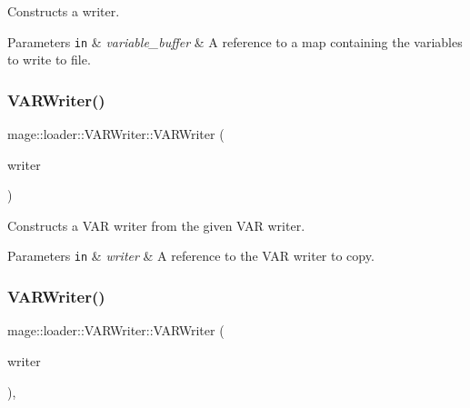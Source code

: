 Constructs a writer.


\begin{DoxyParams}[1]{Parameters}
\mbox{\tt in}  & {\em variable\+\_\+buffer} & A reference to a map containing the variables to write to file. \\
\hline
\end{DoxyParams}
\hypertarget{classmage_1_1loader_1_1_v_a_r_writer_a5ddb3fcd75952ecc8593bc284dc3db0e}{}\label{classmage_1_1loader_1_1_v_a_r_writer_a5ddb3fcd75952ecc8593bc284dc3db0e} 
\subsubsection{\texorpdfstring{V\+A\+R\+Writer()}{VARWriter()}\hspace{0.1cm}{\footnotesize\ttfamily [2/3]}}
{\footnotesize\ttfamily mage\+::loader\+::\+V\+A\+R\+Writer\+::\+V\+A\+R\+Writer (\begin{DoxyParamCaption}\item[{const \hyperlink{classmage_1_1loader_1_1_v_a_r_writer}{V\+A\+R\+Writer} \&}]{writer }\end{DoxyParamCaption})\hspace{0.3cm}{\ttfamily [delete]}}

Constructs a V\+AR writer from the given V\+AR writer.


\begin{DoxyParams}[1]{Parameters}
\mbox{\tt in}  & {\em writer} & A reference to the V\+AR writer to copy. \\
\hline
\end{DoxyParams}
\hypertarget{classmage_1_1loader_1_1_v_a_r_writer_ab8a676252c909a6f8914d786048de255}{}\label{classmage_1_1loader_1_1_v_a_r_writer_ab8a676252c909a6f8914d786048de255} 
\subsubsection{\texorpdfstring{V\+A\+R\+Writer()}{VARWriter()}\hspace{0.1cm}{\footnotesize\ttfamily [3/3]}}
{\footnotesize\ttfamily mage\+::loader\+::\+V\+A\+R\+Writer\+::\+V\+A\+R\+Writer (\begin{DoxyParamCaption}\item[{\hyperlink{classmage_1_1loader_1_1_v_a_r_writer}{V\+A\+R\+Writer} \&\&}]{writer }\end{DoxyParamCaption})\hspace{0.3cm}{\ttfamily [default]}, {\ttfamily [noexcept]}}

